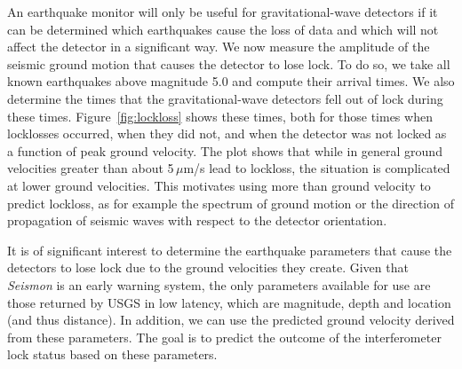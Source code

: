 \documentclass[twocolumn, aps, superscriptaddress]{revtex4}
\begin{document}
An earthquake monitor will only be useful for gravitational-wave detectors if it can be determined which earthquakes cause the loss of data and which will not affect the detector in a significant way.
We now measure the amplitude of the seismic ground motion that causes the detector to lose lock. To do so, we take all known earthquakes above magnitude 5.0 and compute their arrival times. 
We also determine the times that the gravitational-wave detectors fell out of lock during these times. 
Figure~\ref{fig:lockloss} shows these times, both for those times when locklosses occurred, when they did not, and when the detector was not locked as a function of peak ground velocity. 
The plot shows that while in general ground velocities greater than about 5\,$\mu$m/s lead to lockloss, the situation is complicated at lower ground velocities. This motivates using more than ground velocity to predict lockloss, as for example the spectrum of ground motion or the direction of propagation of seismic waves with respect to the detector orientation.

It is of significant interest to determine the earthquake parameters that cause the detectors to lose lock due to the ground velocities they create.
Given that \emph{Seismon} is an early warning system, the only parameters available for use are those returned by USGS in low latency, which are magnitude, depth and location (and thus distance). 
In addition, we can use the predicted ground velocity derived from these parameters.
The goal is to predict the outcome of the interferometer lock status based on these parameters.
\end{document}
